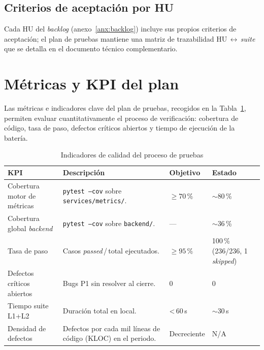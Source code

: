 \subsection*{Criterios de aceptación por \acs{HU}}
Cada \acs{HU} del \emph{backlog} (anexo~\ref{anx:backlog}) incluye
sus propios criterios de aceptación; el plan de pruebas mantiene una
matriz de trazabilidad \acs{HU}\,$\leftrightarrow$\,\emph{suite} que se
detalla en el documento técnico complementario.


\section{Métricas y \acs{KPI} del plan}
\label{sec:anx-pruebas-kpis}

Las métricas e indicadores clave del plan de pruebas, recogidos en la
Tabla~\ref{tab:kpis-pruebas}, permiten evaluar cuantitativamente el proceso
de verificación: cobertura de código, tasa de paso, defectos críticos
abiertos y tiempo de ejecución de la batería.

\begin{table}[H]
  \centering
  \small
  \caption{Indicadores de calidad del proceso de pruebas}
  \label{tab:kpis-pruebas}
  \begin{tabularx}{\textwidth}{l X l l}
    \toprule
    \textbf{KPI} & \textbf{Descripción} & \textbf{Objetivo} &
      \textbf{Estado} \\
    \midrule
    Cobertura motor de métricas & \texttt{pytest --cov} sobre \texttt{services/metrics/}.
                          & $\geq 70$\,\% & $\sim$80\,\% \\
    Cobertura global \emph{backend} & \texttt{pytest --cov} sobre \texttt{backend/}.
                          & --- & $\sim$36\,\% \\
    Tasa de paso          & Casos \emph{passed}\,/\,total ejecutados.
                          & $\geq 95$\,\% & 100\,\% (236/236, 1 \emph{skipped}) \\
    Defectos críticos abiertos & Bugs P1 sin resolver al cierre.
                          & 0           & 0 \\
    Tiempo suite L1+L2    & Duración total en local.
                          & \textless\,60\,s & $\sim$30\,s \\
    Densidad de defectos  & Defectos por cada mil líneas de código (KLOC) en el periodo.
                          & Decreciente   & N/A \\
    \bottomrule
  \end{tabularx}
\end{table}

